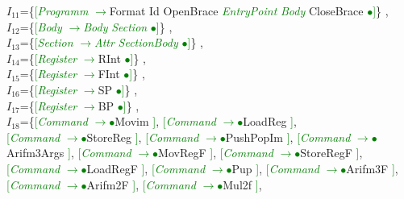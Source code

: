 \documentclass[a0]{a0poster}
\begin{document}
$I_{11}$=\{\textcolor{Green}{[}\textcolor{Green}{\textit{Programm}} \textcolor{Green}{$\to$}Format Id OpenBrace \textcolor{Green}{\textit{EntryPoint}} \textcolor{Green}{\textit{Body}} CloseBrace \textcolor{Green}{$\bullet$}\textcolor{Green}{]}\}
,\\
$I_{12}$=\{\textcolor{Green}{[}\textcolor{Green}{\textit{Body}} \textcolor{Green}{$\to$}\textcolor{Green}{\textit{Body}} \textcolor{Green}{\textit{Section}} \textcolor{Green}{$\bullet$}\textcolor{Green}{]}\}
,\\
$I_{13}$=\{\textcolor{Green}{[}\textcolor{Green}{\textit{Section}} \textcolor{Green}{$\to$}\textcolor{Green}{\textit{Attr}} \textcolor{Green}{\textit{SectionBody}} \textcolor{Green}{$\bullet$}\textcolor{Green}{]}\}
,\\
$I_{14}$=\{\textcolor{Green}{[}\textcolor{Green}{\textit{Register}} \textcolor{Green}{$\to$}RInt \textcolor{Green}{$\bullet$}\textcolor{Green}{]}\}
,\\
$I_{15}$=\{\textcolor{Green}{[}\textcolor{Green}{\textit{Register}} \textcolor{Green}{$\to$}FInt \textcolor{Green}{$\bullet$}\textcolor{Green}{]}\}
,\\
$I_{16}$=\{\textcolor{Green}{[}\textcolor{Green}{\textit{Register}} \textcolor{Green}{$\to$}SP \textcolor{Green}{$\bullet$}\textcolor{Green}{]}\}
,\\
$I_{17}$=\{\textcolor{Green}{[}\textcolor{Green}{\textit{Register}} \textcolor{Green}{$\to$}BP \textcolor{Green}{$\bullet$}\textcolor{Green}{]}\}
,\\
$I_{18}$=\{\textcolor{Green}{[}\textcolor{Green}{\textit{Command}} \textcolor{Green}{$\to$}\textcolor{Green}{$\bullet$}Movim \textcolor{Green}{]}, \textcolor{Green}{[}\textcolor{Green}{\textit{Command}} \textcolor{Green}{$\to$}\textcolor{Green}{$\bullet$}LoadReg \textcolor{Green}{]},\\
\textcolor{Green}{[}\textcolor{Green}{\textit{Command}} \textcolor{Green}{$\to$}\textcolor{Green}{$\bullet$}StoreReg \textcolor{Green}{]}, \textcolor{Green}{[}\textcolor{Green}{\textit{Command}} \textcolor{Green}{$\to$}\textcolor{Green}{$\bullet$}PushPopIm \textcolor{Green}{]}, \textcolor{Green}{[}\textcolor{Green}{\textit{Command}} \textcolor{Green}{$\to$}\textcolor{Green}{$\bullet$}Arifm3Args \textcolor{Green}{]}, \textcolor{Green}{[}\textcolor{Green}{\textit{Command}} \textcolor{Green}{$\to$}\textcolor{Green}{$\bullet$}MovRegF \textcolor{Green}{]}, \textcolor{Green}{[}\textcolor{Green}{\textit{Command}} \textcolor{Green}{$\to$}\textcolor{Green}{$\bullet$}StoreRegF \textcolor{Green}{]}, \textcolor{Green}{[}\textcolor{Green}{\textit{Command}} \textcolor{Green}{$\to$}\textcolor{Green}{$\bullet$}LoadRegF \textcolor{Green}{]}, \textcolor{Green}{[}\textcolor{Green}{\textit{Command}} \textcolor{Green}{$\to$}\textcolor{Green}{$\bullet$}Pup \textcolor{Green}{]}, \textcolor{Green}{[}\textcolor{Green}{\textit{Command}} \textcolor{Green}{$\to$}\textcolor{Green}{$\bullet$}Arifm3F \textcolor{Green}{]}, \textcolor{Green}{[}\textcolor{Green}{\textit{Command}} \textcolor{Green}{$\to$}\textcolor{Green}{$\bullet$}Arifm2F \textcolor{Green}{]}, \textcolor{Green}{[}\textcolor{Green}{\textit{Command}} \textcolor{Green}{$\to$}\textcolor{Green}{$\bullet$}Mul2f \textcolor{Green}{]},\\
\end{document}
